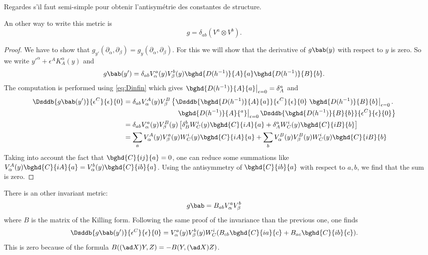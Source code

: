 \begin{probleme}
Regardes s'il faut semi-simple pour obtenir l'antisymétrie des constantes de structure.
\end{probleme}

An other way to write this metric is 
\[
  g=\delta_{ab}(V^a\otimes V^b).
\]

\begin{proof}
We have to show that $g_{y'}(\partial_{\alpha},\partial_{\beta})=g_y(\partial_{\alpha},\partial_{\beta})$. For this we will show that the derivative of $g\bab(y)$ with respect to $y$ is zero. So we write ${y'}^{\alpha}+\epsilon^AK_A^{\alpha}(y)$ and 
\[
   g\bab(y')=\delta_{ab}V^a_{\alpha}(y)V^b_{\beta}(y)\bghd{D(h^{-1})}{A}{a}\bghd{D(h^{-1})}{B}{b}.
\]
The computation is performed using \eqref{eq:Dinfin} which gives $\left.\bghd{ D(h^{-1}) }{A}{a}\right|_{\epsilon=0}=\delta^a_A$ and 
\begin{equation}
\begin{split}
  \Dsddb{  g\bab(y')  }{\epsilon^C}{\epsilon}{0}&=\delta_{ab}V_{\alpha}^A(y)V_{\beta}^B
                                       \left\{  
     \Dsddb{  \bghd{D(h^{-1})}{A}{a}  }{\epsilon^C}{\epsilon}{0}\left.\bghd{D(h^{-1})}{B}{b}\right|_{\epsilon=0}.
                                       \right.\\
 &\phantom{ =\delta_{ab}V_{\alpha}^A(y)V_{\beta}^B  }\quad  \left. \left.\bghd{D(h^{-1})}{A}{^a}\right|_{\epsilon=0}\Dsddb{ \bghd{D(h^{-1})}{B}{b} }{\epsilon^C}{\epsilon}{0}\right\}\\
&=\delta_{ab}V^a_{\alpha}(y)V_{\beta}^B(y)\left[  \delta_B^bW^i_C(y)\bghd{C}{iA}{a}+\delta_A^a W^i_C(y)\bghd{C}{iB}{b}  \right]\\
&=\sum_a V^A_{\alpha}(y)V_{\beta}^a(y)W^i_C(y)\bghd{C}{iA}{a}+\sum_b V^B_{\alpha}(y)V_{\beta}^B(y)W^i_C(y)\bghd{C}{iB}{b}
\end{split}
\end{equation}
Taking into account the fact that $\bghd{C}{ij}{a}=0$, one can reduce some summations like $V_{\alpha}^A(y)\bghd{C}{iA}{a}=V_{\alpha}^b(y)\bghd{C}{ib}{a}$. Using the antisymmetry of $\bghd{C}{ib}{a}$ with respect to $a,b$, we find that the sum is zero.

\end{proof}

There is an other invariant metric:
\begin{equation}
   g\bab=B_{ab}V_{\alpha}^aV_{\beta}^b
\end{equation}
where $B$ is the matrix of the Killing form. Following the same proof of the invariance than the previous one, one finds
\[
  \Dsddb{ g\bab(y') }{\epsilon^C}{\epsilon}{0}=V^a_{\alpha}(y)V^b_{\beta}(y)W_C^i( B_{cb}\bghd{C}{ia}{c}+
                               B_{ac}\bghd{C}{ib}{c} ).
\]
This is zero because of the formula $B((\ad X) Y,Z)=-B(Y,(\ad X) Z)$. 

